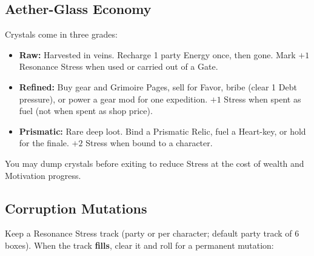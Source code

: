\subsection{Aether-Glass Economy}

Crystals come in three grades:

\begin{itemize}
    \item \textbf{Raw:} Harvested in veins. Recharge 1 party Energy once, then gone. Mark $+1$ Resonance Stress when used or carried out of a Gate.
    \item \textbf{Refined:} Buy gear and Grimoire Pages, sell for Favor, bribe (clear 1 Debt pressure), or power a gear mod for one expedition. $+1$ Stress when spent as fuel (not when spent as shop price).
    \item \textbf{Prismatic:} Rare deep loot. Bind a Prismatic Relic, fuel a Heart-key, or hold for the finale. $+2$ Stress when bound to a character.
\end{itemize}

You may dump crystals before exiting to reduce Stress at the cost of wealth and Motivation progress.

\subsection{Corruption Mutations}

Keep a Resonance Stress track (party or per character; default party track of 6 boxes). When the track \textbf{fills}, clear it and roll  for a permanent mutation:

